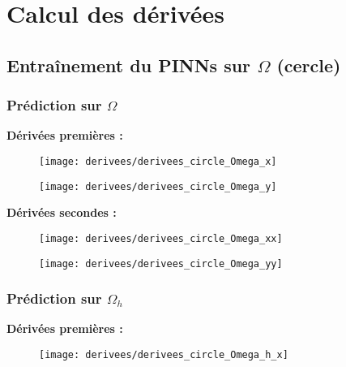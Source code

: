 \section{Calcul des dérivées}

\subsection{Entraînement du PINNs sur $\Omega$ (cercle)}

\subsubsection{Prédiction sur $\Omega$}

\textbf{Dérivées premières :}

\begin{figure}[H]
	\centering
	\texttt{[image: derivees/derivees\_circle\_Omega\_x]}
	\label{fig:deriveescircleomegax}
\end{figure}

\begin{figure}[H]
	\centering
	\texttt{[image: derivees/derivees\_circle\_Omega\_y]}
	\label{fig:deriveescircleomegay}
\end{figure}

\newpage

\textbf{Dérivées secondes :}

\begin{figure}[H]
	\centering
	\texttt{[image: derivees/derivees\_circle\_Omega\_xx]}
	\label{fig:deriveescircleomegaxx}
\end{figure}

\begin{figure}[H]
	\centering
	\texttt{[image: derivees/derivees\_circle\_Omega\_yy]}
	\label{fig:deriveescircleomegayy}
\end{figure}

\newpage

\subsubsection{Prédiction sur $\Omega_h$}

\textbf{Dérivées premières :}

\begin{figure}[H]
	\centering
	\texttt{[image: derivees/derivees\_circle\_Omega\_h\_x]}
	\label{fig:deriveescircleomegahx}
\end{figure}

